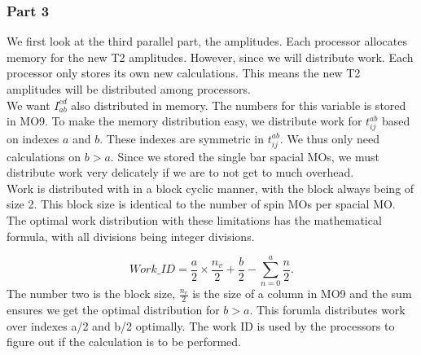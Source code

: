 \documentclass[a4paper,norsk,11pt,twoside]{report}
\begin{document}
\subsubsection{Part 3}
We first look at the third parallel part, the amplitudes. Each processor allocates memory for the new T2 amplitudes. However, since we will distribute work. Each processor only stores its own new calculations. This means the new T2 amplitudes will be distributed among processors. \\

We want $I_{ab}^{cd}$ also distributed in memory. The numbers for this variable is stored in MO9. To make the memory distribution easy, we distribute work for $t_{ij}^{ab}$ based on indexes $a$ and $b$. These indexes are symmetric in $t_{ij}^{ab}$. We thus only need calculations on $b > a$. Since we stored the single bar spacial MOs, we must distribute work very delicately if we are to not get to much overhead. \\

Work is distributed with in a block cyclic manner, with the block always being of size 2. This block size is identical to the number of spin MOs per spacial MO. The optimal work distribution with these limitations has the mathematical formula, with all divisions being integer divisions.

\begin{equation}
Work\_ID = \frac{a}{2} \times \frac{n_v}{2} + \frac{b}{2} - \sum_{n=0}^a \frac{n}{2} .
\end{equation}
The number two is the block size, $\frac{n_v}{2}$ is the size of a column in MO9 and the sum ensures we get the optimal distribution for $b > a$. This forumla distributes work over indexes a/2 and b/2 optimally. The work ID is used by the processors to figure out if the calculation is to be performed.
\end{document}
